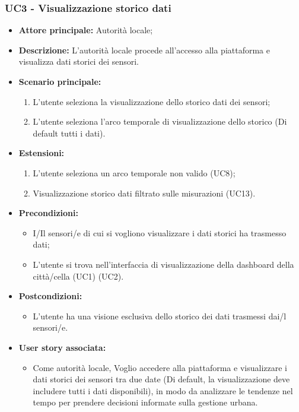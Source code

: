 \subsubsection{UC3 - Visualizzazione storico dati }

\begin{itemize}
    \item \textbf{Attore principale:} Autorità locale;
    \item \textbf{Descrizione:} L'autorità locale procede all'accesso alla piattaforma e visualizza dati storici dei sensori.
    \item \textbf{Scenario principale:}
          \begin{enumerate}
              \item L'utente seleziona la visualizzazione dello storico dati dei sensori;
              \item L'utente seleziona l'arco temporale di visualizzazione dello storico (Di default tutti i dati).
          \end{enumerate}
    \item \textbf{Estensioni:}
          \begin{enumerate}
              \item L'utente seleziona un arco temporale non valido (UC8);
              \item Visualizzazione storico dati filtrato sulle misurazioni (UC13).
          \end{enumerate}
    \item \textbf{Precondizioni:}
          \begin{itemize}
              \item  I/Il sensori/e di cui si vogliono visualizzare i dati storici ha trasmesso dati;
              \item  L'utente si trova nell'interfaccia di visualizzazione della dashboard della città/cella  (UC1) (UC2).
          \end{itemize}
    \item \textbf{Postcondizioni:}
          \begin{itemize}
              \item  L'utente ha una visione esclusiva dello storico dei dati trasmessi  dai/l sensori/e.
          \end{itemize}
    \item \textbf{User story associata:}
          \begin{itemize}
              \item Come autorità locale,
                    Voglio accedere alla piattaforma e visualizzare i dati storici dei sensori tra due date (Di default, la
                    visualizzazione deve includere
                    tutti i dati disponibili),
                    in modo da analizzare le tendenze nel tempo per prendere decisioni informate sulla gestione urbana.
          \end{itemize}
\end{itemize}